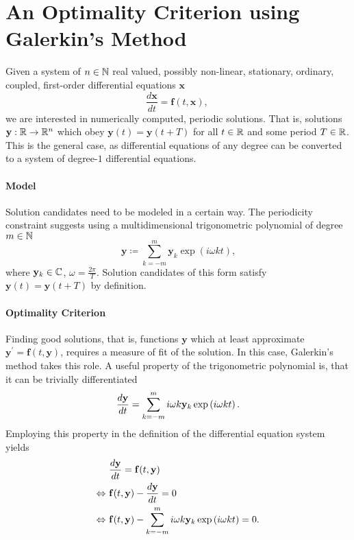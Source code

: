 \section{An Optimality Criterion using Galerkin's Method}

Given a system of $n \in \mathbb{N}$ real valued, possibly non-linear, stationary, ordinary, coupled, first-order differential equations $\mathbf{x}$
	\begin{equation} \label{eq:SDE}
		\frac{d\mathbf{x}}{dt} = \mathbf{f}(t, \mathbf{x}) \text{, }
	\end{equation}
we are interested in numerically computed, periodic solutions.
That is, solutions $\mathbf{y}: \mathbb{R} \to \mathbb{R}^n$ which obey $\mathbf{y}(t) = \mathbf{y}(t+T)$ for all $t \in \mathbb{R}$ and some period $T \in \mathbb{R}$.
This is the general case, as differential equations of any degree can be converted to a system of degree-$1$ differential equations.

\paragraph{Model} Solution candidates need to be modeled in a certain way.
The periodicity constraint suggests using a multidimensional trigonometric polynomial of degree $m \in \mathbb{N}$
	\[
		\mathbf{y} \coloneqq \sum_{k = -m}^m \mathbf{y}_k \exp\left(i \omega k t\right) \text{,}
	\]
where $\mathbf{y}_k \in \mathbb{C}$, $\omega = \frac{2\pi}T$. %
Solution candidates of this form satisfy $\mathbf{y}(t) = \mathbf{y}(t+T)$ by definition.

\paragraph{Optimality Criterion} Finding good solutions, that is, functions $\mathbf{y}$ which at least approximate $\mathbf{y}^\prime = \mathbf{f}(t, \mathbf{y})$, requires a measure of fit of the solution.
In this case, Galerkin's method takes this role.
A useful property of the trigonometric polynomial is, that it can be trivially differentiated
	\[
		\frac{d\mathbf{y}}{dt} = \sum_{k = -m}^m i \omega k \mathbf{y}_k \exp\left(i \omega k t\right) \text.
	\]
Employing this property in the definition of the differential equation system yields
	\begin{align*}
			& \frac{d\mathbf{y}}{dt} = \mathbf{f}(t,\mathbf{y})\\
		\Leftrightarrow\ & \mathbf{f}(t,\mathbf{y}) - \frac{d\mathbf{y}}{dt} = 0\\
		\Leftrightarrow\ & \mathbf{f}(t,\mathbf{y}) - \sum_{k = -m}^m i \omega k \mathbf{y}_k \exp\left(i \omega k t\right) = 0 \text.
	\end{align*}

